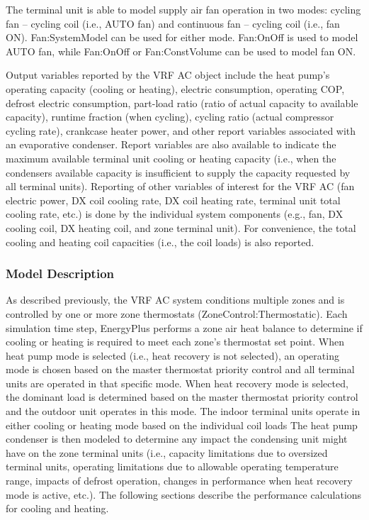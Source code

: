 The terminal unit is able to model supply air fan operation in two modes: cycling fan -- cycling coil (i.e., AUTO fan) and continuous fan -- cycling coil (i.e., fan ON). Fan:SystemModel can be used for either mode. Fan:OnOff is used to model AUTO fan, while Fan:OnOff or Fan:ConstVolume can be used to model fan ON.

Output variables reported by the VRF AC object include the heat pump's operating capacity (cooling or heating), electric consumption, operating COP, defrost electric consumption, part-load ratio (ratio of actual capacity to available capacity), runtime fraction (when cycling), cycling ratio (actual compressor cycling rate), crankcase heater power, and other report variables associated with an evaporative condenser. Report variables are also available to indicate the maximum available terminal unit cooling or heating capacity (i.e., when the condensers available capacity is insufficient to supply the capacity requested by all terminal units). Reporting of other variables of interest for the VRF AC (fan electric power, DX coil cooling rate, DX coil heating rate, terminal unit total cooling rate, etc.) is done by the individual system components (e.g., fan, DX cooling coil, DX heating coil, and zone terminal unit). For convenience, the total cooling and heating coil capacities (i.e., the coil loads) is also reported.

\subsubsection{Model Description}\label{model-description-015}

As described previously, the VRF AC system conditions multiple zones and is controlled by one or more zone thermostats (ZoneControl:Thermostatic). Each simulation time step, EnergyPlus performs a zone air heat balance to determine if cooling or heating is required to meet each zone's thermostat set point. When heat pump mode is selected (i.e., heat recovery is not selected), an operating mode is chosen based on the master thermostat priority control and all terminal units are operated in that specific mode. When heat recovery mode is selected, the dominant load is determined based on the master thermostat priority control and the outdoor unit operates in this mode. The indoor terminal units operate in either cooling or heating mode based on the individual coil loads The heat pump condenser is then modeled to determine any impact the condensing unit might have on the zone terminal units (i.e., capacity limitations due to oversized terminal units, operating limitations due to allowable operating temperature range, impacts of defrost operation, changes in performance when heat recovery mode is active, etc.). The following sections describe the performance calculations for cooling and heating.

